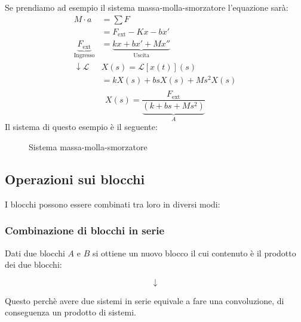 \documentclass[a4paper]{article}
\begin{document}
\begin{example}
  Se prendiamo ad esempio il sistema massa-molla-smorzatore l'equazione sarà:
  \[
    \begin{aligned}
      M \cdot a &= \sum F\\
                &= F_{\text{ext}} - Kx - bx'\\
      \underbrace{F_{\text{ext}}}_{\text{Ingresso}} &= \underbrace{kx + bx'+Mx''}_
                {\text{Uscita}}\\
      \downarrow \mathcal{L} & X(s) = \mathcal{L}\left[ x(t) \right](s) \\
                             &= k X(s) +bs X(s)+ M s^2 X(s)\\
    \end{aligned}
  \] 
  \[
    X(s) = \frac{F_{\text{ext}}}{\underbrace{\left( k + bs + Ms^2 \right)}_{A}}
  \] 
  \noindent
  Il sistema di questo esempio è il seguente:
  \begin{figure}[H]
    \centering
    \caption{Sistema massa-molla-smorzatore}
  \end{figure}
\end{example}

\subsection{Operazioni sui blocchi}
I blocchi possono essere combinati tra loro in diversi modi:
\subsubsection{Combinazione di blocchi in serie}
Dati due blocchi \( A \) e \( B \) si
ottiene un nuovo blocco il cui contenuto è il prodotto dei due blocchi:
\begin{figure}[H]
  \centering
  \[
    \downarrow
  \] 
\end{figure}
\noindent
Questo perchè avere due sistemi in serie equivale a fare una convoluzione, di conseguenza
un prodotto di sistemi.
\end{document}
